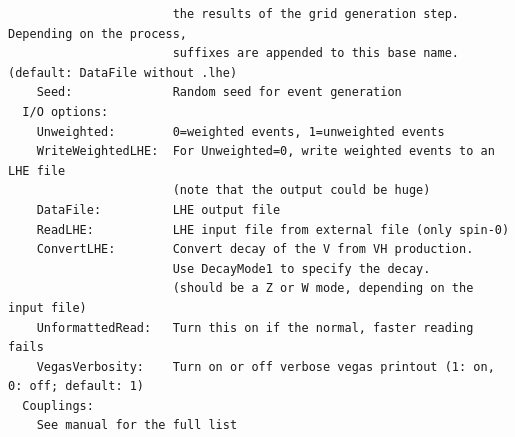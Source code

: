 \documentclass[aps,superscriptaddress,nofootinbib]{revtex4}
\begin{document}
\begin{verbatim}
                       the results of the grid generation step.  Depending on the process,
                       suffixes are appended to this base name. (default: DataFile without .lhe)
    Seed:              Random seed for event generation
  I/O options:
    Unweighted:        0=weighted events, 1=unweighted events
    WriteWeightedLHE:  For Unweighted=0, write weighted events to an LHE file
                       (note that the output could be huge)
    DataFile:          LHE output file
    ReadLHE:           LHE input file from external file (only spin-0)
    ConvertLHE:        Convert decay of the V from VH production.
                       Use DecayMode1 to specify the decay.
                       (should be a Z or W mode, depending on the input file)
    UnformattedRead:   Turn this on if the normal, faster reading fails
    VegasVerbosity:    Turn on or off verbose vegas printout (1: on, 0: off; default: 1)
  Couplings:
    See manual for the full list
\end{verbatim}
\end{document}
